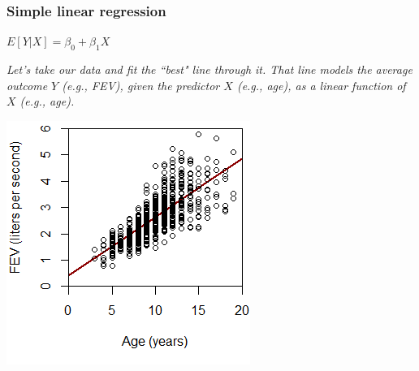 \documentclass[12pt, 
hyperref={colorlinks=true, linkcolor=blue, urlcolor=cyan},dvipsnames]{beamer}
\begin{document}
\begin{frame}
\frametitle{Simple linear regression}

\begin{center} 
 \color{red} $E[Y|X] = \beta_0 + \beta_1 X$ \color{black}
\end{center} \vspace{-0.3cm}

\begin{small} \textit{Let's take our data and fit the ``best" line through it. That line models the average outcome $Y$ (e.g., FEV), given the predictor $X$ (e.g., age), as a linear function of $X$ (e.g., age).} \end{small}

\center
\vspace{-0.3cm} \center \includegraphics[height=0.65\textheight]{./plots/plot_fev_vs_age}

\end{frame}

\end{document}
